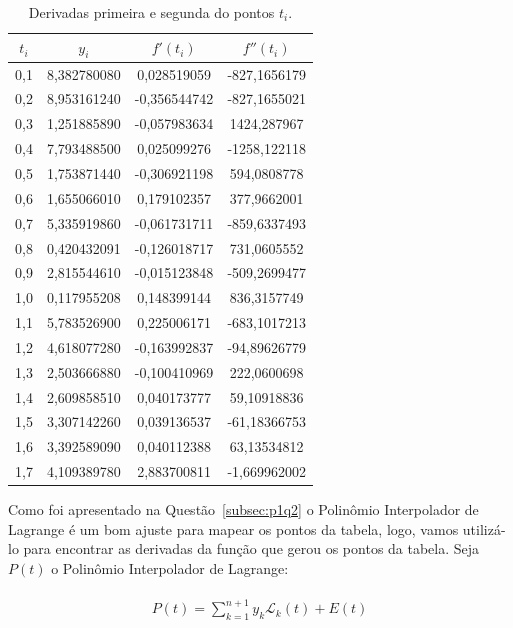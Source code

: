 \documentclass[12pt]{article}
\begin{document}
\begin{table}[H]
	\centering
	\begin{tabular}{|c|c|c|c|}
		\hline
		$t_{i}$ & $y_{i}$ & $f'(t_{i})$ & $f''(t_{i})$  \\\hline
		0,1 & 8,382780080 & 0,028519059 &	-827,1656179 \\\hline
		0,2 & 8,953161240 & -0,356544742 & -827,1655021 \\\hline
		0,3 & 1,251885890 & -0,057983634 & 1424,287967\\\hline
		0,4 & 7,793488500 & 0,025099276 & -1258,122118\\\hline
		0,5 & 1,753871440 & -0,306921198 & 594,0808778\\\hline
		0,6 & 1,655066010 & 0,179102357 & 377,9662001\\\hline
		0,7 & 5,335919860 & -0,061731711 & -859,6337493\\\hline
		0,8 & 0,420432091 & -0,126018717 & 731,0605552\\\hline
		0,9 & 2,815544610 & -0,015123848 & -509,2699477\\\hline
		1,0 & 0,117955208 & 0,148399144 & 836,3157749\\\hline
		1,1 & 5,783526900 & 0,225006171 & -683,1017213\\\hline
		1,2 & 4,618077280 & -0,163992837 & -94,89626779\\\hline
		1,3 & 2,503666880 & -0,100410969 & 222,0600698\\\hline
		1,4 & 2,609858510 & 0,040173777 & 59,10918836\\\hline
		1,5 & 3,307142260 & 0,039136537 & -61,18366753\\\hline
		1,6 & 3,392589090 & 0,040112388 & 63,13534812\\\hline
		1,7 & 4,109389780 & 2,883700811 & -1,669962002\\\hline
	\end{tabular}
	\caption{Derivadas primeira e segunda do pontos $t_{i}$.}
	\label{tab:ti}
\end{table}

Como foi apresentado na Questão~\ref{subsec:p1q2} o Polinômio Interpolador de Lagrange é um bom ajuste para mapear os pontos da tabela, logo, vamos utilizá-lo para encontrar as derivadas da função que gerou os pontos da tabela. Seja $P(t)$ o Polinômio Interpolador de Lagrange:

\begin{eqnarray}
\begin{split}
P(t) = \sum_{k=1}^{n+1} y_{k} \mathcal{L}_{k}(t) + E(t)
\end{split}
\label{eq:dlagrange}
\end{eqnarray}
\end{document}
